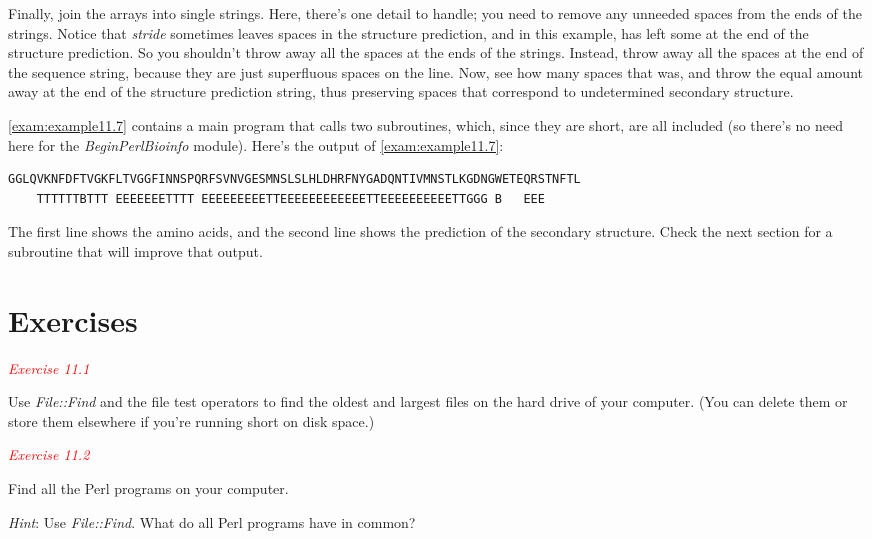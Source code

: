 Finally, join the arrays into single strings. Here, there's one detail to handle; you need to remove any unneeded spaces from the ends of the strings. Notice that \textit{stride} sometimes leaves spaces in the structure prediction, and in this example, has left some at the end of the structure prediction. So you shouldn't throw away all the spaces at the ends of the strings. Instead, throw away all the spaces at the end of the sequence string, because they are just superfluous spaces on the line. Now, see how many spaces that was, and throw the equal amount away at the end of the structure prediction string, thus preserving spaces that correspond to undetermined secondary structure.

\autoref{exam:example11.7} contains a main program that calls two subroutines, which, since they are short, are all included (so there's no need here for the \textit{BeginPerlBioinfo} module). Here's the output of \autoref{exam:example11.7}: 

\begin{lstlisting}
GGLQVKNFDFTVGKFLTVGGFINNSPQRFSVNVGESMNSLSLHLDHRFNYGADQNTIVMNSTLKGDNGWETEQRSTNFTL
    TTTTTTBTTT EEEEEEETTTT EEEEEEEEETTEEEEEEEEEEEETTEEEEEEEEEETTGGG B   EEE     
\end{lstlisting}

The first line shows the amino acids, and the second line shows the prediction of the secondary structure. Check the next section for a subroutine that will improve that output. 


\textcolor{red}{\textit{}}
\begin{adjustwidth}{1cm}{}

\end{adjustwidth}


\textbf{}




\section{Exercises}
\textcolor{red}{\textit{Exercise 11.1}}
\begin{adjustwidth}{1cm}{}
Use \textit{File::Find} and the file test operators to find the oldest and largest files on the hard drive of your computer. (You can delete them or store them elsewhere if you're running short on disk space.)
\end{adjustwidth}

\textcolor{red}{\textit{Exercise 11.2}}
\begin{adjustwidth}{1cm}{}
Find all the Perl programs on your computer.

\textit{Hint}: Use \textit{File::Find}. What do all Perl programs have in common?
\end{adjustwidth}

